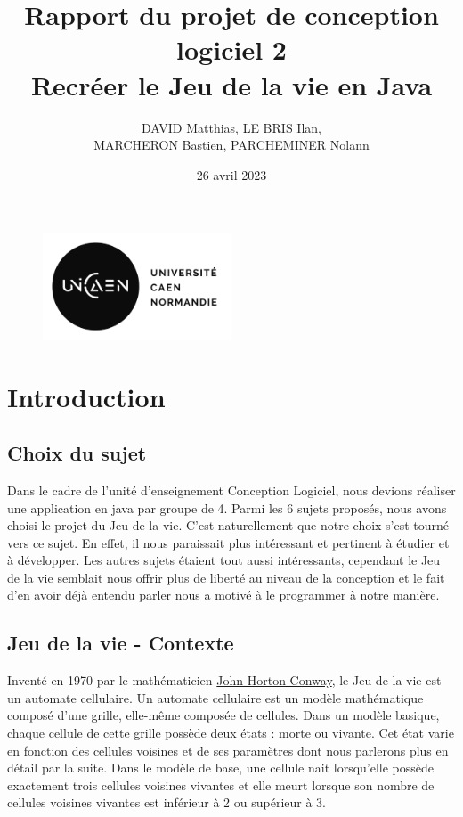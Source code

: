 \documentclass[12pt]{article}
\title{%
	Rapport du projet de conception logiciel 2 \\
	\large Recréer le Jeu de la vie en Java}
\author{DAVID Matthias, LE BRIS Ilan,\\ MARCHERON Bastien, PARCHEMINER Nolann}
\date{26 avril 2023}
\begin{document}
	\maketitle
	\begin{figure}[!h]
		\centering
		\includegraphics[width=0.5\textwidth]{images/logo_unicaen.png}
	\end{figure}
	\newpage
	
	\setcounter{tocdepth}{3}
	\tableofcontents
	\newpage
	
	\section{Introduction}
		\subsection{Choix du sujet}
			Dans le cadre de l'unité d'enseignement Conception Logiciel, nous devions réaliser une application en java par groupe de 4. 
			Parmi les 6 sujets proposés, nous avons choisi le projet du Jeu de la vie. C'est naturellement que notre choix s'est tourné vers ce sujet. 
			En effet, il nous paraissait plus intéressant et pertinent à étudier et à développer. Les autres sujets étaient tout aussi intéressants, 
			cependant le Jeu de la vie semblait nous offrir plus de liberté au niveau de la conception et 
			le fait d'en avoir déjà entendu parler nous a motivé à le programmer à notre manière. 
			
		\subsection{Jeu de la vie - Contexte}
			Inventé en 1970 par le mathématicien \href{https://fr.wikipedia.org/wiki/John_Horton_Conway}{John Horton Conway}, le Jeu de la vie est un automate cellulaire. 
			Un automate cellulaire est un modèle mathématique composé d'une grille, elle-même composée de cellules. Dans un modèle basique, 
			chaque cellule de cette grille possède deux états : morte ou vivante. Cet état varie en fonction des cellules voisines et de ses 
			paramètres dont nous parlerons plus en détail par la suite. Dans le modèle de base, une cellule nait lorsqu'elle possède exactement 
			trois cellules voisines vivantes et elle meurt lorsque son nombre de cellules voisines vivantes est inférieur à 2 ou supérieur à 3. 
			
\end{document}
